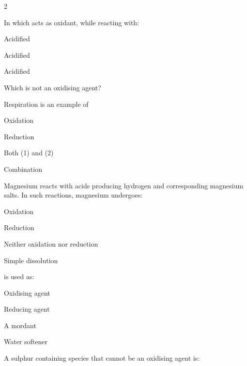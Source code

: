 \documentclass[10pt,a4paper]{article}
\begin{document}
\begin{multicols}{2}
\begin{questions}
\item In which  acts as oxidant, while reacting with:
\begin{options}
  \item Acidified 
  \item Acidified 
  \item {}
  \item Acidified 
\end{options}

\item Which is not an oxidising agent?
\begin{options}
  \item {}
  \item {}
  \item {}
  \item {}
\end{options}

\item Respiration is an example of
\begin{options}
  \item Oxidation
  \item Reduction
  \item Both (1) and (2)
  \item Combination
\end{options}

\item Magnesium reacts with acids producing hydrogen and corresponding magnesium salts. In such reactions, magnesium undergoes:
\begin{options}
  \item Oxidation
  \item Reduction
  \item Neither oxidation nor reduction
  \item Simple dissolution
\end{options}

\item {} is used as:
\begin{options}
  \item Oxidising agent
  \item Reducing agent
  \item A mordant
  \item Water softener
\end{options}

\item A sulphur containing species that cannot be an oxidising agent is:
\begin{options}
  \item {}
  \item {}
  \item {}
  \item {}
\end{options}


\end{questions}
\end{multicols}
\end{document}
